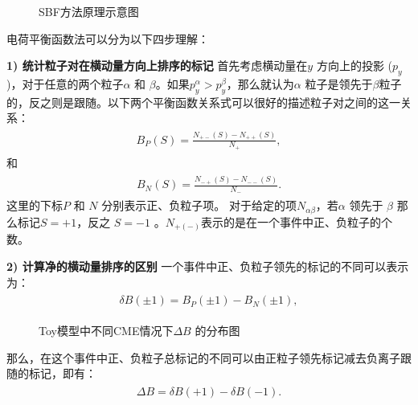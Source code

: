 \begin{figure}[htbp]
\centering
{}
\caption{SBF方法原理示意图 ~\cite{Tang2019} }
\label{fig:BF_cartoon}
\end{figure}

电荷平衡函数法可以分为以下四步理解：

\textbf{1) 统计粒子对在横动量方向上排序的标记 } 首先考虑横动量在$y$ 方向上的投影 ($p_y$)，对于任意的两个粒子$\alpha$ 和 $\beta$。如果$p^\alpha_y >  p^\beta_y$，那么就认为$\alpha$ 粒子是领先于$\beta$粒子的，反之则是跟随。以下两个平衡函数关系式可以很好的描述粒子对之间的这一关系：
\begin{eqnarray}
\begin{aligned}
B_{P} (S) =  \frac{N_{+-}(S)-N_{++}(S)}{N_+},
\end{aligned}
\label{eq:Bp}
\end{eqnarray}
和
\begin{eqnarray}
\begin{aligned}
B_{N} (S) =  \frac{N_{-+}(S)-N_{--}(S)}{N_-}.
\end{aligned}
\label{eq:Bn}
\end{eqnarray}
这里的下标$P$ 和 $N$ 分别表示正、负粒子项。
对于给定的项$N_{\alpha\beta}$，若$\alpha$ 领先于 $\beta$ 那么标记$S=+1$，反之 $S=-1$ 。$N_{+(-)}$表示的是在一个事件中正、负粒子的个数。


\textbf{2) 计算净的横动量排序的区别 } 一个事件中正、负粒子领先的标记的不同可以表示为：
\begin{eqnarray}
\begin{aligned}
\delta B(\pm 1) =  B_{P}(\pm 1)-B_{N}(\pm 1),
\end{aligned}
\label{eq:deltaB_pm}
\end{eqnarray}

\begin{figure}[htbp]
\centering
{}
\caption{Toy模型中不同CME情况下$\Delta B$ 的分布图 ~\cite{Tang2019} }
\label{fig:BFHisto_lab_example}
\end{figure}
那么，在这个事件中正、负粒子总标记的不同可以由正粒子领先标记减去负离子跟随的标记，即有：
\begin{eqnarray}
\begin{aligned}
\Delta B =  \delta B(+1) - \delta B(-1).
\end{aligned}
\label{eq:deltaB}
\end{eqnarray}

